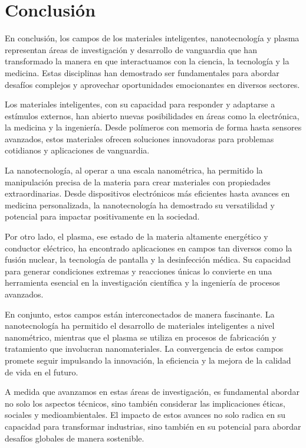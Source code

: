 \section*{Conclusi\'on}

En conclusión, los campos de los materiales inteligentes, nanotecnología y plasma representan áreas de investigación y desarrollo de vanguardia que han transformado la manera en que interactuamos con la ciencia, la tecnología y la medicina. Estas disciplinas han demostrado ser fundamentales para abordar desafíos complejos y aprovechar oportunidades emocionantes en diversos sectores.

Los materiales inteligentes, con su capacidad para responder y adaptarse a estímulos externos, han abierto nuevas posibilidades en áreas como la electrónica, la medicina y la ingeniería. Desde polímeros con memoria de forma hasta sensores avanzados, estos materiales ofrecen soluciones innovadoras para problemas cotidianos y aplicaciones de vanguardia.

La nanotecnología, al operar a una escala nanométrica, ha permitido la manipulación precisa de la materia para crear materiales con propiedades extraordinarias. Desde dispositivos electrónicos más eficientes hasta avances en medicina personalizada, la nanotecnología ha demostrado su versatilidad y potencial para impactar positivamente en la sociedad.

Por otro lado, el plasma, ese estado de la materia altamente energético y conductor eléctrico, ha encontrado aplicaciones en campos tan diversos como la fusión nuclear, la tecnología de pantalla y la desinfección médica. Su capacidad para generar condiciones extremas y reacciones únicas lo convierte en una herramienta esencial en la investigación científica y la ingeniería de procesos avanzados.

En conjunto, estos campos están interconectados de manera fascinante. La nanotecnología ha permitido el desarrollo de materiales inteligentes a nivel nanométrico, mientras que el plasma se utiliza en procesos de fabricación y tratamiento que involucran nanomateriales. La convergencia de estos campos promete seguir impulsando la innovación, la eficiencia y la mejora de la calidad de vida en el futuro.

A medida que avanzamos en estas áreas de investigación, es fundamental abordar no solo los aspectos técnicos, sino también considerar las implicaciones éticas, sociales y medioambientales. El impacto de estos avances no solo radica en su capacidad para transformar industrias, sino también en su potencial para abordar desafíos globales de manera sostenible.